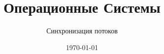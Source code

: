 \documentclass[handout,12pt]{beamer}
\title{Операционные Системы}
\subtitle{Синхронизация потоков}
\date{\today}
\begin{document}
  \begin{frame}
    \titlepage
  \end{frame}
  
  
  
  
  
  
  
\end{document}
